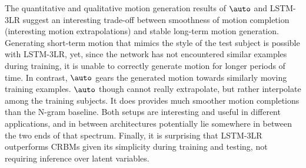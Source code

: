 \documentclass[10pt,twocolumn,letterpaper]{article}
\begin{document}
The quantitative and qualitative motion generation results of $\auto$ and LSTM-3LR suggest an interesting trade-off between smoothness of motion completion (interesting motion extrapolations) and stable long-term motion generation. Generating short-term motion that mimics the style of the test subject is possible with LSTM-3LR, yet, since the network has not encountered similar  examples during  training, it is unable to correctly generate motion for longer periods of time. In contrast, $\auto$ gears the  generated motion towards similarly moving training examples. $\auto$  though cannot really extrapolate, but rather interpolate among the training subjects. It does   provides much smoother motion completions than the N-gram baseline. Both setups are interesting and useful in different applications, and in between architectures potentially lie somewhere in between the two ends of that spectrum. Finally, it is surprising that LSTM-3LR outperforms CRBMs given its simplicity during  training and testing, not requiring inference over latent variables. 
\end{document}
